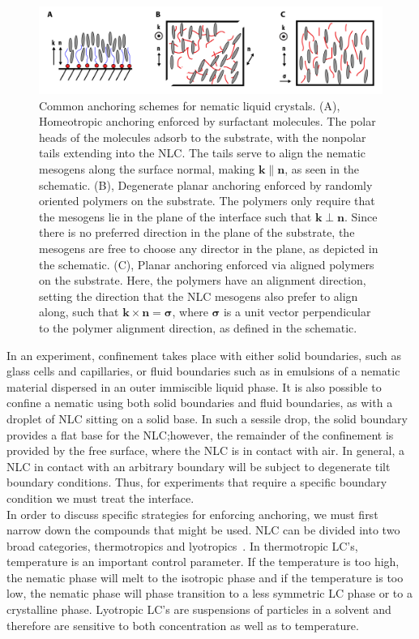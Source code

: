 \begin{figure}[h]
  \centering
  \includegraphics{figures/C2/Ch2-Figs_Anchor.png}
  \caption{Common anchoring schemes for nematic liquid crystals. (A), Homeotropic anchoring enforced by surfactant molecules.
  The polar heads of the molecules adsorb to the substrate, with the nonpolar tails extending into the NLC.
  The tails serve to align the nematic mesogens along the surface normal, making $\mathbf{k} \parallel \mathbf{n}$, as seen in the schematic.
  (B), Degenerate planar anchoring enforced by randomly oriented polymers on the substrate. The polymers only require that the mesogens lie in the plane of the interface such that $\mathbf{k} \perp \mathbf{n}$. Since there is no preferred direction in the plane of the substrate, the mesogens are free to choose any director in the plane, as depicted in the schematic.
  (C), Planar anchoring enforced via aligned polymers on the substrate. Here, the polymers have an alignment direction, setting the direction that the NLC mesogens also prefer to align along, such that $\mathbf{k} \times \mathbf{n} = \bm{\sigma}$, where $\bm{\sigma}$ is a unit vector perpendicular to the polymer alignment direction, as defined in the schematic.}\label{f:2-Anchor}
\end{figure}

In an experiment, confinement takes place with either solid boundaries, such as glass cells and capillaries, or fluid boundaries such as in emulsions of a nematic material dispersed in an outer immiscible liquid phase.
It is also possible to confine a nematic using both solid boundaries and fluid boundaries, as with a droplet of NLC sitting on a solid base.
In such a sessile drop, the solid boundary provides a flat base for the NLC;\@ however, the remainder of the confinement is provided by the free surface, where the NLC is in contact with air.
In general, a NLC in contact with an arbitrary boundary will be subject to degenerate tilt boundary conditions.
Thus, for experiments that require a specific boundary condition we must treat the interface.\\

In order to discuss specific strategies for enforcing anchoring, we must first narrow down the compounds that might be used.
NLC can be divided into two broad categories, thermotropics and lyotropics~\cite{RN33}.
In thermotropic LC's, temperature is an important control parameter.
If the temperature is too high, the nematic phase will melt to the isotropic phase and if the temperature is too low, the nematic phase will phase transition to a less symmetric LC phase or to a crystalline phase.
Lyotropic LC's are suspensions of particles in a solvent and therefore are sensitive to both concentration as well as to temperature.

